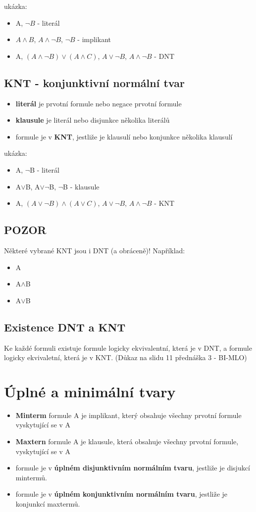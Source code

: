 \documentclass{szzclass}
\begin{document}
ukázka:
\begin{itemize}
	\item A, $\neg B$ - literál
	\item $A \wedge B$, $A \wedge \neg B$, $\neg B$ - implikant
	\item A, $(A \wedge \neg B) \vee (A \wedge C)$, $A \vee \neg B$, $A \wedge \neg B$ - DNT
\end{itemize}
\subsection{KNT - konjunktivní normální tvar}
\begin{itemize}
	\item \textbf{literál} je prvotní formule nebo negace prvotní formule
	\item \textbf{klausule} je literál nebo disjunkce několika literálů
	\item formule je v \textbf{KNT}, jestliže je klausulí nebo konjunkce několika klausulí 
\end{itemize}

ukázka:
\begin{itemize}
	\item A, $\neg$B - literál
	\item A$\vee$B, A$\vee$$\neg$B, $\neg$B - klausule
	\item A, $(A \vee \neg B) \wedge (A \vee C)$, $A \vee\neg B$, $A \wedge \neg B$ - KNT
\end{itemize}

\subsection{POZOR}
Některé vybrané KNT jsou i DNT (a obráceně)! Například:
\begin{itemize}
	\item A
	\item A$\wedge$B
	\item A$\vee$B
\end{itemize}
\subsection{Existence DNT a KNT}
Ke každé formuli existuje formule logicky ekvivalentní, která je v DNT, a formule logicky ekvivaletní, která je v KNT.
(Důkaz na slidu 11 přednáška 3 - BI-MLO)
\section{Úplné a minimální tvary}
\begin{itemize}
	\item \textbf{Minterm} formule A je implikant, který obsahuje všechny prvotní formule vyskytující se v A
	\item \textbf{Maxtern} formule A je klausule, která obsahuje všechny prvotní formule, vyskytující se v A
	\item formule je v \textbf{úplném disjunktivním normálním tvaru}, jestliže je disjukcí mintermů.
	\item formule je v \textbf{úplném konjunktivním normálním tvaru}, jestliže je konjunkcí maxtermů.
\end{itemize}
\end{document}
